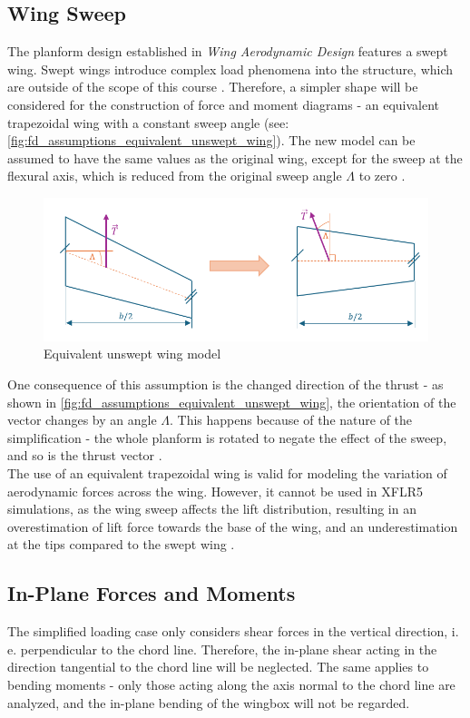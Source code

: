 \subsection*{Wing Sweep}
The planform design established in \textit{Wing Aerodynamic Design} \cite{Koppejan2024WingDesign} features a swept wing. Swept wings introduce complex load phenomena into the structure, which are outside of the scope of this course \cite{Timmer2024AE2111-IReader}. Therefore, a simpler shape will be considered for the construction of force and moment diagrams - an equivalent trapezoidal wing with a constant sweep angle (see: \autoref{fig:fd_assumptions_equivalent_unswept_wing}). The new model can be assumed to have the same values as the original wing, except for the sweep at the flexural axis, which is reduced from the original sweep angle $\Lambda$ to zero \cite{Timmer2024AE2111-IReader}.
\begin{figure}[h]
    \centering
    \includegraphics[width=0.85\linewidth]{figures/wing_sweep_effect.png}
    \caption{Equivalent unswept wing model}
    \label{fig:fd_assumptions_equivalent_unswept_wing}
\end{figure}

\noindent One consequence of this assumption is the changed direction of the thrust - as shown in \autoref{fig:fd_assumptions_equivalent_unswept_wing}, the orientation of the vector changes by an angle $\Lambda$. This happens because of the nature of the simplification - the whole planform is rotated to negate the effect of the sweep, and so is the thrust vector \cite{Timmer2024AE2111-IReader}.\\

\noindent The use of an equivalent trapezoidal wing is valid for modeling the variation of aerodynamic forces across the wing. However, it cannot be used in XFLR5 simulations, as the wing sweep affects the lift distribution, resulting in an overestimation of lift force towards the base of the wing, and an underestimation at the tips compared to the swept wing \cite{Timmer2024AE2111-IReader}.

\subsection*{In-Plane Forces and Moments}
The simplified loading case only considers shear forces in the vertical direction, i. e. perpendicular to the chord line. Therefore, the in-plane shear acting in the direction tangential to the chord line will be neglected. The same applies to bending moments - only those acting along the axis normal to the chord line are analyzed, and the in-plane bending of the wingbox will not be regarded.\\

